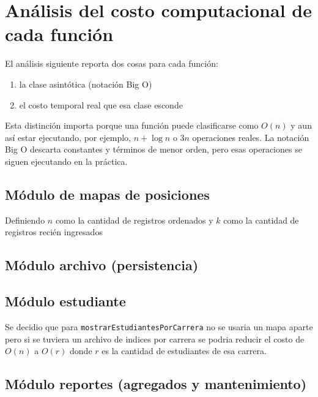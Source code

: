 \section{Análisis del costo computacional de cada función}

El análisis siguiente reporta dos cosas para cada función: 
\begin{enumerate}
    \item la clase asintótica (notación Big O)
    \item el costo temporal real que esa clase esconde
\end{enumerate}

Esta distinción importa porque una función puede clasificarse como $O(n)$ y aun así estar ejecutando,
por ejemplo, $n + \log n$ o $3n$ operaciones reales. La notación Big O descarta constantes y términos de
menor orden, pero esas operaciones se siguen ejecutando en la práctica.

\subsection{Módulo de mapas de posiciones}

Definiendo $n$ como la cantidad de registros ordenados y $k$ como la cantidad de registros recién ingresados



\subsection{Módulo archivo (persistencia)}



\subsection{Módulo estudiante}



Se decidio que para \texttt{mostrarEstudiantesPorCarrera} no se usaria un mapa aparte pero si se tuviera un archivo
de indices por carrera se podria reducir el costo de $O(n)$ a $O(r)$ donde $r$ es la cantidad de estudiantes de esa carrera.

\subsection{Módulo reportes (agregados y mantenimiento)}

